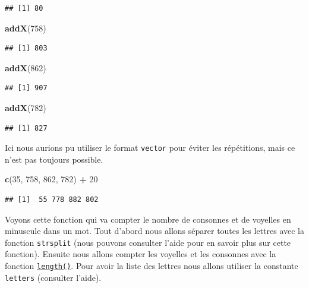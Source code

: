 \documentclass[]{book}
\newenvironment{Shaded}{\begin{snugshade}}{\end{snugshade}}
\newcommand{\DecValTok}[1]{\textcolor[rgb]{0.00,0.00,0.81}{#1}}
\newcommand{\KeywordTok}[1]{\textcolor[rgb]{0.13,0.29,0.53}{\textbf{#1}}}
\newcommand{\NormalTok}[1]{#1}
\newcommand{\OperatorTok}[1]{\textcolor[rgb]{0.81,0.36,0.00}{\textbf{#1}}}
\newcommand{\StringTok}[1]{\textcolor[rgb]{0.31,0.60,0.02}{#1}}
\begin{document}
\begin{verbatim}
## [1] 80
\end{verbatim}

\begin{Shaded}
\begin{Highlighting}[]
\KeywordTok{addX}\NormalTok{(}\DecValTok{758}\NormalTok{)}
\end{Highlighting}
\end{Shaded}

\begin{verbatim}
## [1] 803
\end{verbatim}

\begin{Shaded}
\begin{Highlighting}[]
\KeywordTok{addX}\NormalTok{(}\DecValTok{862}\NormalTok{)}
\end{Highlighting}
\end{Shaded}

\begin{verbatim}
## [1] 907
\end{verbatim}

\begin{Shaded}
\begin{Highlighting}[]
\KeywordTok{addX}\NormalTok{(}\DecValTok{782}\NormalTok{)}
\end{Highlighting}
\end{Shaded}

\begin{verbatim}
## [1] 827
\end{verbatim}

Ici nous aurions pu utiliser le format \texttt{vector} pour éviter les répétitions, mais ce n'est pas toujours possible.

\begin{Shaded}
\begin{Highlighting}[]
\KeywordTok{c}\NormalTok{(}\DecValTok{35}\NormalTok{, }\DecValTok{758}\NormalTok{, }\DecValTok{862}\NormalTok{, }\DecValTok{782}\NormalTok{) }\OperatorTok{+}\StringTok{ }\DecValTok{20}
\end{Highlighting}
\end{Shaded}

\begin{verbatim}
## [1]  55 778 882 802
\end{verbatim}

Voyons cette fonction qui va compter le nombre de consonnes et de voyelles en minuscule dans un mot. Tout d'abord nous allons séparer toutes les lettres avec la fonction \texttt{strsplit} (nous pouvons consulter l'aide pour en savoir plus sur cette fonction). Ensuite nous allons compter les voyelles et les consonnes avec la fonction \protect\hyperlink{l015length}{\texttt{length()}}. Pour avoir la liste des lettres nous allons utiliser la constante \texttt{letters} (consulter l'aide).
\end{document}
